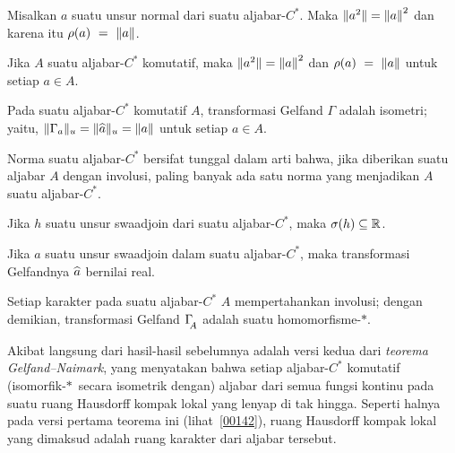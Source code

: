 \begin{prop}\label{00152141} Misalkan $a$ suatu unsur normal dari suatu aljabar-$C^*$. Maka
$\lVert a^2\rVert = {\lVert a\rVert}^2$ dan karena itu $\rho(a)~=~\lVert a\rVert$.
\end{prop}

\begin{cor}\label{00152142} Jika $A$ suatu aljabar-$C^*$ komutatif, maka
$\lVert a^2\rVert = {\lVert a\rVert}^2$ dan $\rho(a)~=~\lVert a\rVert$ untuk setiap $a \in A$.
\end{cor}

\begin{cor}\label{00152143} Pada suatu aljabar-$C^*$ komutatif $A$, transformasi Gelfand
$\Gamma$ adalah isometri; yaitu, $\lVert\Gamma_a\rVert_u = \lVert\widehat{a}\rVert_u = \lVert a\rVert$ untuk
setiap $a \in A$.
\end{cor}

\begin{cor}\label{00152144} Norma suatu aljabar-$C^*$ bersifat tunggal dalam arti bahwa, jika
diberikan suatu aljabar $A$ dengan involusi, paling banyak ada satu norma yang menjadikan
$A$ suatu aljabar-$C^*$.
\end{cor}

\begin{prop}\label{00152145} Jika $h$ suatu unsur swaadjoin dari suatu aljabar-$C^*$,
maka $\sigma(h) \subseteq \mathbb{R}$.
\end{prop}

\begin{prop}\label{00152152} Jika $a$ suatu unsur swaadjoin dalam suatu aljabar-$C^*$,
maka transformasi Gelfandnya $\widehat{a}$ bernilai real.
\end{prop}

\begin{prop}\label{00152153} Setiap karakter pada suatu aljabar-$C^*$ $A$ mempertahankan
involusi; dengan demikian, transformasi Gelfand $\Gamma_{{}_{\scriptstyle{\!\!A}}}$ adalah suatu
homomorfisme-$*$.
\end{prop}

Akibat langsung dari hasil-hasil sebelumnya adalah versi kedua dari
\emph{teorema Gelfand--Naimark}, yang menyatakan bahwa setiap aljabar-$C^*$ komutatif
(isomorfik-$*\,$ secara isometrik dengan) aljabar dari semua fungsi kontinu pada suatu ruang
Hausdorff kompak lokal yang lenyap di tak hingga. Seperti halnya pada versi pertama
teorema ini (lihat~\ref{00142}), ruang Hausdorff kompak lokal yang dimaksud adalah ruang
karakter dari aljabar tersebut.

